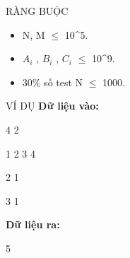 RÀNG BUỘC
\begin{itemize}
	\item     N, M  $\le$  10^5.   
	\item     $A_{i}$    , $B_{i}$    , $C_{i}$     $\le$  10^9.   
	\item     30\% số test N  $\le$  1000.   
\end{itemize}
VÍ DỤ
\textbf{    Dữ liệu vào:   }

   4 2  

   1 2 3 4  

   2 1  

   3 1  

\textbf{    Dữ liệu ra:   }

   5